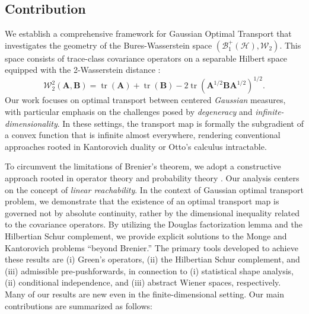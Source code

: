 \documentclass[noinfoline]{imsart}\setcounter{tocdepth}{2}
\newcommand{\m}[1]{\mathbf{#1}} %
\renewcommand{\c}[1]{\mathcal{#1}} %
\DeclareMathOperator*{\tr}{tr}
\theoremstyle{plain}
\begin{document}
\subsection{Contribution}
We establish a comprehensive framework for Gaussian Optimal Transport that investigates the geometry of the Bures-Wasserstein space $(\c{B}_{1}^{+}(\c{H}), \c{W}_{2})$. This space consists of trace-class covariance operators on a separable Hilbert space equipped with the 2-Wasserstein distance \cite{dowson1982frechet, olkin1982distance, cuesta1996lower, pigoli2014distances, masarotto2019procrustes}:
\begin{equation*}
    \c{W}_{2}^{2}(\m{A}, \m{B}) = \tr(\m{A}) + \tr(\m{B}) - 2 \tr (\m{A}^{1/2} \m{B} \m{A}^{1/2})^{1/2}.
\end{equation*}
Our work focuses on optimal transport between centered \emph{Gaussian} measures, with particular emphasis on the challenges posed by \emph{degeneracy} and \emph{infinite-dimensionality}. In these settings, the transport map is formally the subgradient of a convex function that is infinite almost everywhere, rendering conventional approaches rooted in Kantorovich duality or Otto's calculus intractable.

To circumvent the limitations of Brenier’s theorem, we adopt a constructive approach rooted in operator theory \cite{conway2019course, hall2013quantum, reed1980methods, riesz2012functional} and probability theory \cite{kallenberg1997foundations, billingsley2013convergence, bogachev1998gaussian}. Our analysis centers on the concept of \emph{linear reachability}. In the context of Gaussian optimal transport problem, we demonstrate that the existence of an optimal transport map is governed not by absolute continuity, rather by the dimensional inequality related to the covariance operators. By utilizing the Douglas factorization lemma and the Hilbertian Schur complement, we provide explicit solutions to the Monge and Kantorovich problems ``beyond Brenier.''
The primary tools developed to achieve these results are (i) Green's operators, (ii) the Hilbertian Schur complement, and (iii) admissible pre-pushforwards, in connection to (i) statistical shape analysis, (ii) conditional independence, and (iii) abstract Wiener spaces, respectively. Many of our results are new even in the finite-dimensional setting. Our main contributions are summarized as follows:
\end{document}
